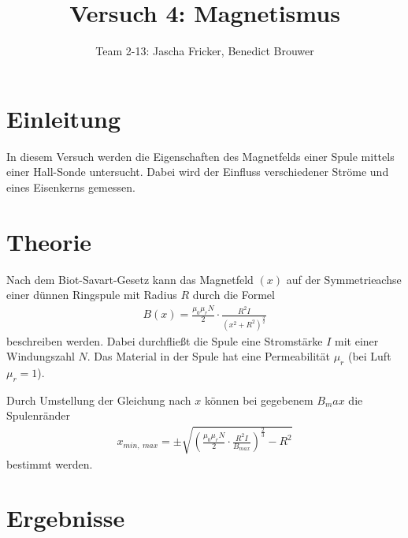 \documentclass[11pt, a4paper]{article}
\title{Versuch 4: Magnetismus}
\author{Team 2-13: Jascha Fricker, Benedict Brouwer}
\begin{document}
    \maketitle

    \tableofcontents

    \newpage

    \section{Einleitung}

    In diesem Versuch werden die Eigenschaften des Magnetfelds einer Spule mittels einer Hall-Sonde untersucht. Dabei wird der Einfluss verschiedener Ströme und eines Eisenkerns gemessen.

    \section{Theorie}

    Nach dem Biot-Savart-Gesetz kann das Magnetfeld $(x)$ auf der Symmetrieachse einer dünnen Ringspule mit Radius $R$ durch die Formel
    \begin{align}
        B(x) = \frac{\mu_0 \mu_r N}{2} \cdot \frac{R^2 I}{\left(x^2 + R^2\right)^{\frac{3}{2}}} \label{eq:BiotSavart}
    \end{align}
    beschreiben werden. Dabei durchfließt die Spule eine Stromstärke $I$ mit einer Windungszahl $N$. Das Material in der Spule hat eine Permeabilität $\mu_r$ (bei Luft $\mu_r = 1$).
    
    Durch Umstellung der Gleichung nach $x$ können bei gegebenem $B_max$ die Spulenränder
    \begin{align}
        x_{min, \ max} = \pm \sqrt{\left(\frac{\mu_0 \mu_r N}{2} \cdot \frac{R^2 I}{B_{max}}\right)^\frac{2}{3} - R^2} \label{eq:bmax}
    \end{align}
    bestimmt werden. 

    \section{Ergebnisse}
\end{document}
